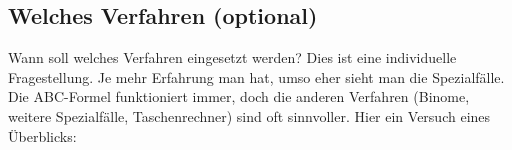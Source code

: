 







\newpage
\TALS{}
\newpage

\subsection{Welches Verfahren (optional)}
Wann soll welches Verfahren eingesetzt werden? Dies ist eine
individuelle Fragestellung. Je mehr Erfahrung man hat, umso eher sieht
man die Spezialfälle. Die ABC-Formel funktioniert immer, doch
die anderen Verfahren (Binome, weitere Spezialfälle, Taschenrechner)
sind oft sinnvoller. Hier ein Versuch eines Überblicks:

